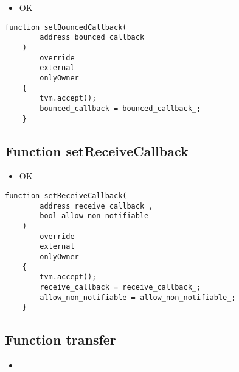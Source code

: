 \begin{itemize}
\item OK
\end{itemize}

\begin{lstlisting}[firstnumber=568]
    function setBouncedCallback(
        address bounced_callback_
    )
        override
        external
        onlyOwner
    {
        tvm.accept();
        bounced_callback = bounced_callback_;
    }
\end{lstlisting}

\subsection{Function setReceiveCallback}

\begin{itemize}
\item OK
\end{itemize}

\begin{lstlisting}[firstnumber=550]
    function setReceiveCallback(
        address receive_callback_,
        bool allow_non_notifiable_
    )
        override
        external
        onlyOwner
    {
        tvm.accept();
        receive_callback = receive_callback_;
        allow_non_notifiable = allow_non_notifiable_;
    }
\end{lstlisting}

\subsection{Function transfer}

\begin{itemize}
\item {}
\end{itemize}

